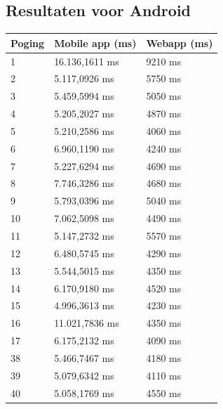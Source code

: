 \documentclass[pdftex,a4paper,12pt,twoside]{report}
\begin{document}
\subsection{Resultaten voor Android}
\begin{center}
  \begin{tabular}{ | l | l | l |}
    \hline
    Poging & Mobile app (ms) & Webapp (ms)
    \\ \hline
    1	& 16.136,1611 ms & 9210 ms
    \\ \hline
    2	& 5.117,0926 ms & 5750 ms
    \\ \hline
    3	& 5.459,5994 ms & 5050 ms
    \\ \hline
    4	& 5.205,2027 ms & 4870 ms
    \\ \hline
    5	& 5.210,2586 ms & 4060 ms
    \\ \hline
    6	& 6.960,1190 ms & 4240 ms
    \\ \hline
    7	& 5.227,6294 ms & 4690 ms
    \\ \hline
    8	& 7.746,3286 ms & 4680 ms
    \\ \hline
    9	& 5.793,0396 ms & 5040 ms
    \\ \hline
    10	& 7.062,5098 ms & 4490 ms
    \\ \hline
    11	& 5.147,2732 ms & 5570 ms
    \\ \hline
    12	& 6.480,5745 ms & 4290 ms
    \\ \hline
    13	& 5.544,5015 ms & 4350 ms
    \\ \hline
    14	& 6.170,9180 ms & 4520 ms
    \\ \hline
    15	& 4.996,3613 ms & 4230 ms
    \\ \hline
    16	& 11.021,7836 ms & 4350 ms
    \\ \hline
    17	& 6.175,2132 ms & 4090 ms
    \\ \hline
    38	& 5.466,7467 ms & 4180 ms
    \\ \hline
    39	& 5.079,6342 ms & 4110 ms
    \\ \hline
    40	& 5.058,1769 ms & 4550 ms
    \\ \hline
  \end{tabular}
\end{center}
\newpage
\end{document}
